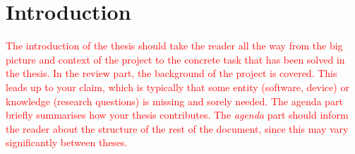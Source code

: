 \chapter{Introduction}\label{cha:introduction}
%
\textcolor{red}{The introduction of the thesis should take the reader all the way from the big picture and context of the project to the concrete task that has been solved in the thesis. In the review part, the background of the project is covered. This leads up to your claim, which is typically that some entity (software, device) or knowledge (research questions) is missing and sorely needed. The agenda part briefly summarises how your thesis contributes. The \emph{agenda} part should inform the reader about the structure of the rest of the document, since this may vary significantly between theses.}